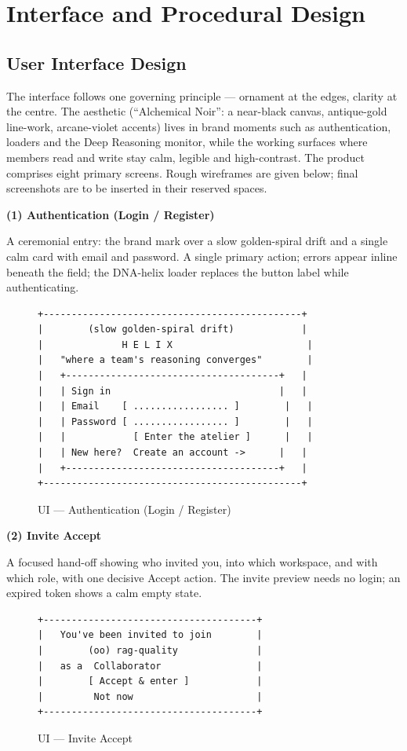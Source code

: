 \documentclass[12pt,a4paper]{report}
\begin{document}
\section{Interface and Procedural Design}
\subsection{User Interface Design}
The interface follows one governing principle --- ornament at the edges, clarity at the centre. The aesthetic (``Alchemical Noir'': a near-black canvas, antique-gold line-work, arcane-violet accents) lives in brand moments such as authentication, loaders and the Deep Reasoning monitor, while the working surfaces where members read and write stay calm, legible and high-contrast. The product comprises eight primary screens. Rough wireframes are given below; final screenshots are to be inserted in their reserved spaces.

\noindent\textbf{(1) Authentication (Login / Register)}

A ceremonial entry: the brand mark over a slow golden-spiral drift and a single calm card with email and password. A single primary action; errors appear inline beneath the field; the DNA-helix loader replaces the button label while authenticating.

\begin{figure}[H]\centering
\begin{lstlisting}
+----------------------------------------------+
|        (slow golden-spiral drift)            |
|              H E L I X                        |
|   "where a team's reasoning converges"        |
|   +--------------------------------------+   |
|   | Sign in                              |   |
|   | Email    [ ................. ]        |   |
|   | Password [ ................. ]        |   |
|   |            [ Enter the atelier ]      |   |
|   | New here?  Create an account ->      |   |
|   +--------------------------------------+   |
+----------------------------------------------+
\end{lstlisting}
\caption{UI --- Authentication (Login / Register)}
\end{figure}

\noindent\textbf{(2) Invite Accept}

A focused hand-off showing who invited you, into which workspace, and with which role, with one decisive Accept action. The invite preview needs no login; an expired token shows a calm empty state.

\begin{figure}[H]\centering
\begin{lstlisting}
+--------------------------------------+
|   You've been invited to join        |
|        (oo) rag-quality              |
|   as a  Collaborator                 |
|        [ Accept & enter ]            |
|         Not now                      |
+--------------------------------------+
\end{lstlisting}
\caption{UI --- Invite Accept}
\end{figure}
\end{document}
